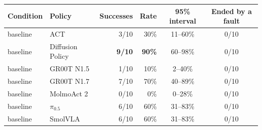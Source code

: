 \begin{tabular}{l l r r c c}
\toprule
Condition & Policy & Successes & Rate & 95\% interval & Ended by a fault \\
\midrule
baseline & ACT & 3/10 & 30\% & 11--60\% & 0/10 \\
baseline & Diffusion Policy & \textbf{9/10} & \textbf{90\%} & 60--98\% & 0/10 \\
baseline & GR00T N1.5 & 1/10 & 10\% & 2--40\% & 0/10 \\
baseline & GR00T N1.7 & 7/10 & 70\% & 40--89\% & 0/10 \\
baseline & MolmoAct 2 & 0/10 & 0\% & 0--28\% & 0/10 \\
baseline & $\pi_{0.5}$ & 6/10 & 60\% & 31--83\% & 0/10 \\
baseline & SmolVLA & 6/10 & 60\% & 31--83\% & 0/10 \\
\bottomrule
\end{tabular}
